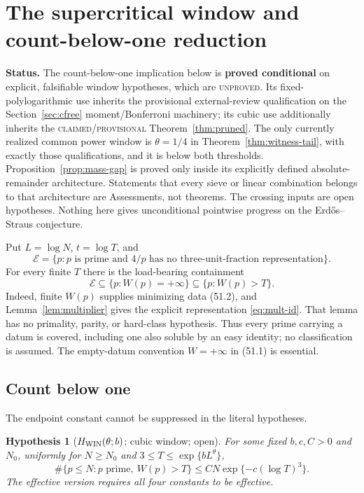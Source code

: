 \documentclass[10pt,reqno]{amsart}
\newtheorem{hypothesis}[theorem]{Hypothesis}
\theoremstyle{definition}
\newcommand{\1}{\mathbf 1}
\begin{document}
\section{The supercritical window and count-below-one reduction}
\label{sec:supercritical-window}
\medskip\noindent\textbf{Status.}
The count-below-one implication below is \textbf{proved conditional} on
explicit, falsifiable window hypotheses, which are \textsc{unproved}.  Its
fixed-polylogarithmic use inherits the provisional external-review
qualification on the Section~\ref{sec:cfree} moment/Bonferroni machinery;
its cubic use additionally inherits the
\textsc{claimed}/\allowbreak\textsc{provisional}
Theorem~\ref{thm:pruned}.  The only currently realized common power window
is $\theta=1/4$ in Theorem~\ref{thm:witness-tail}, with exactly those
qualifications, and it is below both thresholds.  Proposition~\ref{prop:mass-gap}
is proved only inside its explicitly defined absolute-remainder
architecture.  Statements that every sieve or linear combination belongs to
that architecture are Assessments, not theorems.  The crossing inputs are
open hypotheses.  Nothing here gives unconditional pointwise progress on
the Erd\H{o}s--Straus conjecture.

Put $L=\log N$, $t=\log T$, and
\[
 \mathcal E=\{p:p\text{ is prime and }4/p\text{ has no three-unit-fraction
 representation}\}.
\]
For every finite $T$ there is the load-bearing containment
\begin{equation}\tag{57.1}
 \mathcal E\subseteq\{p:W(p)=+\infty\}
       \subseteq\{p:W(p)>T\}.
\end{equation}
Indeed, finite $W(p)$ supplies minimizing data (51.2), and
Lemma~\ref{lem:multiplier} gives the explicit representation
\eqref{eq:mult-id}.  That lemma has no primality, parity, or hard-class
hypothesis.  Thus every prime carrying a datum is covered, including one
also soluble by an easy identity; no classification is assumed.  The
empty-datum convention $W=+\infty$ in (51.1) is essential.

\subsection{Count below one}
The endpoint constant cannot be suppressed in the literal hypotheses.

\begin{hypothesis}[$H_{\rm WIN}(\theta;b)$; cubic window; open]
\label{hyp:WIN-cubic}
For some fixed $b,c,C>0$ and $N_0$, uniformly for $N\geq N_0$ and
$3\leq T\leq\exp\{bL^\theta\}$,
\begin{equation}\tag{57.2}
 \#\{p\leq N:p\text{ prime},\ W(p)>T\}
       \leq CN\exp\{-c(\log T)^3\}.
\end{equation}
The effective version requires all four constants to be effective.
\end{hypothesis}
\end{document}
